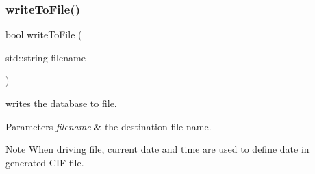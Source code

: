 \subsubsection{\texorpdfstring{write\+To\+File()}{writeToFile()}}
{\footnotesize\ttfamily bool write\+To\+File (\begin{DoxyParamCaption}\item[{std\+::string}]{filename }\end{DoxyParamCaption})}



writes the database to file. 


\begin{DoxyParams}{Parameters}
{\em filename} & the destination file name.\\
\hline
\end{DoxyParams}
\begin{DoxyNote}{Note}
When driving file, current date and time are used to define date in generated C\+IF file. 
\end{DoxyNote}
